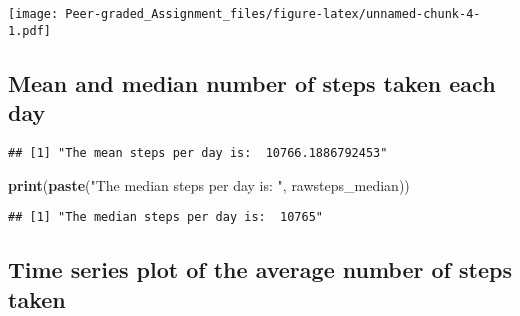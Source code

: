 \documentclass[
]{article}
\newenvironment{Shaded}{\begin{snugshade}}{\end{snugshade}}
\newcommand{\DataTypeTok}[1]{\textcolor[rgb]{0.13,0.29,0.53}{#1}}
\newcommand{\KeywordTok}[1]{\textcolor[rgb]{0.13,0.29,0.53}{\textbf{#1}}}
\newcommand{\NormalTok}[1]{#1}
\newcommand{\OperatorTok}[1]{\textcolor[rgb]{0.81,0.36,0.00}{\textbf{#1}}}
\newcommand{\OtherTok}[1]{\textcolor[rgb]{0.56,0.35,0.01}{#1}}
\newcommand{\StringTok}[1]{\textcolor[rgb]{0.31,0.60,0.02}{#1}}
\begin{document}
\texttt{[image: Peer-graded\_Assignment\_files/figure-latex/unnamed-chunk-4-1.pdf]}

\hypertarget{mean-and-median-number-of-steps-taken-each-day}{%
\subsection{Mean and median number of steps taken each
day}\label{mean-and-median-number-of-steps-taken-each-day}}

\begin{Shaded}
\end{Shaded}

\begin{verbatim}
## [1] "The mean steps per day is:  10766.1886792453"
\end{verbatim}

\begin{Shaded}
\begin{Highlighting}[]
\KeywordTok{print}\NormalTok{(}\KeywordTok{paste}\NormalTok{(}\StringTok{"The median steps per day is: "}\NormalTok{, rawsteps_median))}
\end{Highlighting}
\end{Shaded}

\begin{verbatim}
## [1] "The median steps per day is:  10765"
\end{verbatim}

\hypertarget{time-series-plot-of-the-average-number-of-steps-taken}{%
\subsection{Time series plot of the average number of steps
taken}\label{time-series-plot-of-the-average-number-of-steps-taken}}
\end{document}
